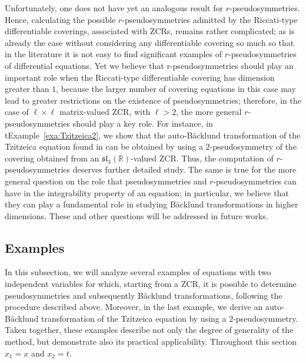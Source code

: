 \documentclass[12pt,english]{elsarticle}
\theoremstyle{plain}
\theoremstyle{plain}
\theoremstyle{remark}
\theoremstyle{plain}
\theoremstyle{definition}
\theoremstyle{definition}
\begin{document}
Unfortunately, one does not have yet an analogous result for $r$-pseudosymmetries.
Hence, calculating the possible $r$-pseudosymmetries admitted by the Riccati-type
differentiable coverings, associated with ZCRs, remains rather complicated;
as is already the case without considering any differentiable covering
so much so that in the literature it is not easy to find significant examples
of $r$-pseudosymmetries of differential equations. Yet we believe that
r-pseudosymmetries should play an important role when the Riccati-type
differentiable covering has dimension greater than $1$, because the larger
number of covering equations in this case may lead to greater restrictions
on the existence of pseudosymmetries; therefore, in the case of
$\ell \times \ell $ matrix-valued ZCR, with $\ell >2$, the more general
$r$-pseudosymmetries should play a key role. For instance, in t{Example~\ref{exa:Tzitzeica2}}, we show that the auto-B\"{a}cklund transformation
of the Tzitzeica equation found in \cite{Brez} can be obtained by using
a $2$-pseudosymmetry of the covering obtained from an
$\mathfrak{sl}_{3}(\mathbb{R})$-valued ZCR. Thus, the computation of
$r$-pseudosymmetries deserves further detailed study. The same is true
for the more general question on the role that pseudosymmetries and
$r$-pseudosymmetries can have in the integrability property of an equation;
in particular, we believe that they can play a fundamental role in studying
B\"{a}cklund transformations in higher dimensions. These and other questions
will be addressed in future works.



\subsection{Examples}
\label{sec4.1}

In this subsection, we will analyze several examples of equations with
two independent variables for which, starting from a ZCR, it is possible
to determine pseudosymmetries and subsequently B\"{a}cklund transformations,
following the procedure described above. Moreover, in the last example,
we derive an auto-B\"{a}cklund transformation of the Tzitzeica equation
by using a $2$-pseudosymmetry. Taken together, these examples describe
not only the degree of generality of the method, but demonstrate also its
practical applicability. Throughout this section $x_{1}=x$ and
$x_{2}=t$.
\end{document}
